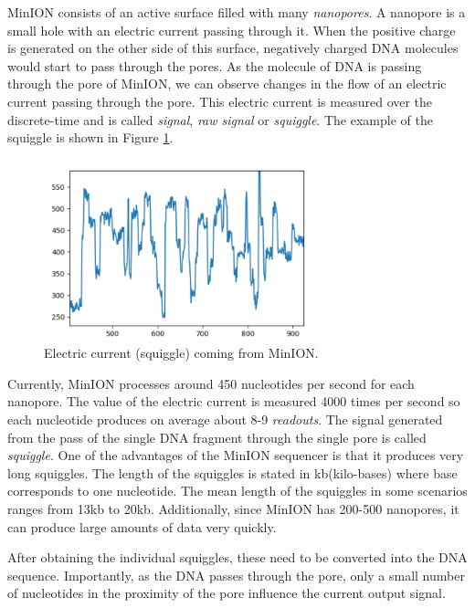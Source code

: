 MinION consists of an active surface filled with many \textit{nanopores}. A nanopore
is a small hole with an electric current passing through it. When the positive charge
is generated on the other side of this surface, negatively charged DNA molecules
would start to pass through the pores. As the molecule of DNA is passing through the pore of
MinION, we can observe changes in the flow of an electric current passing through the pore.
This electric current is measured over the discrete-time and is called \textit{signal},
\textit{raw signal} or \textit{squiggle}. The example of the squiggle is shown in Figure \ref{obr:minIonCurrent}.

\begin{figure}
\centerline{\includegraphics[width=0.7\textwidth, height=0.3\textheight]{images/signal}}
\caption[MinION signal]{Electric current (squiggle) coming from MinION.}
\label{obr:minIonCurrent}
\end{figure}

Currently, MinION processes around 450 nucleotides per second for each nanopore.
The value of the electric current is measured 4000 times per second so each
nucleotide produces on average about 8-9 \textit{readouts}. The signal
generated from the pass of the single DNA fragment through the single pore is called \textit{squiggle}.
One of the advantages of the MinION sequencer is that it produces very long squiggles.
The length of the squiggles is stated in kb(kilo-bases) where base corresponds to one nucleotide.
The mean length of the squiggles in some scenarios ranges from 13kb to 20kb. Additionally,
since MinION has 200-500 nanopores, it can produce large amounts of data very quickly.


After obtaining the individual squiggles, these need to be converted into the DNA
sequence. Importantly, as the DNA passes through the pore, only a small
number of nucleotides in the proximity of the pore influence the current output signal.


